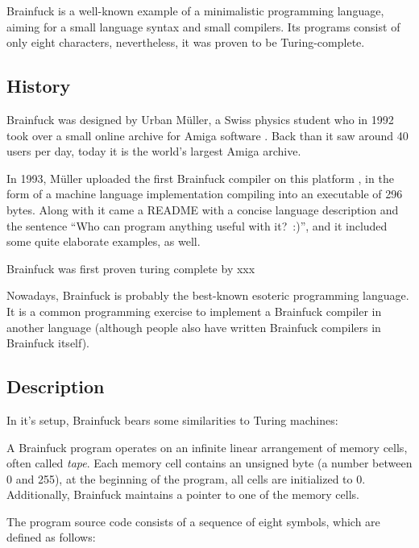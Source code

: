 Brainfuck is a well-known example of a minimalistic programming language, aiming for a small language syntax and small compilers. Its programs consist of only eight characters, nevertheless, it was proven to be Turing-complete.

\subsection{History}

Brainfuck was designed by Urban Müller, a Swiss physics student who in 1992 took over a small online archive for Amiga software \cite{muller1993aminet}. Back than it saw around 40 users per day, today it is the world's largest Amiga archive.

In 1993, Müller uploaded the first Brainfuck compiler on this platform \cite{muller1993240}, in the form of a machine language implementation compiling into an executable of 296 bytes. Along with it came a README with a concise language description and the sentence “Who can program anything useful with it?~:)”, and it included some quite elaborate examples, as well.


Brainfuck was first proven turing complete by xxx

Nowadays, Brainfuck is probably the best-known esoteric programming language. It is a common programming exercise to implement a Brainfuck compiler in another language (although people also have written Brainfuck compilers in Brainfuck itself).

\subsection{Description}

In it's setup, Brainfuck bears some similarities to Turing machines:

A Brainfuck program operates on an infinite linear arrangement of memory cells, often called \emph{tape}. Each memory cell contains an unsigned byte (a number between 0 and 255), at the beginning of the program, all cells are initialized to 0. Additionally, Brainfuck maintains a pointer to one of the memory cells.

The program source code consists of a sequence of eight symbols, which are defined as follows:

